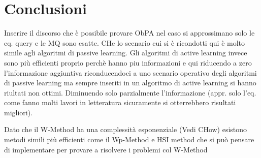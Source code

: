 \chapter*{Conclusioni}
\label{cap:con}

Inserire il discorso che è possibile provare ObPA nel caso si approssimano solo le eq. query e le MQ sono esatte. CHe lo scenario cui si è ricondotti qui è molto simile agli algoritmi di passive learning. Gli algoritmi di active learning invece sono più efficienti proprio perchè hanno piu informazioni e qui riducendo a zero l'informazione aggiuntiva riconducendoci a uno scenario operativo degli algoritmi di passive learning ma sempre inseriti in un algoritmo di active learning si hanno riultati non ottimi. Diminuendo solo parzialmente l'informazione (appr. solo l'eq. come fanno molti lavori in letteratura sicuramente si otterrebbero risultati migliori).

Dato che il W-Method ha una complessità esponenziale (Vedi CHow) esistono metodi simili più efficienti come il Wp-Method e HSI method che si può pensare di implementare per provare a risolvere i problemi col W-Method
